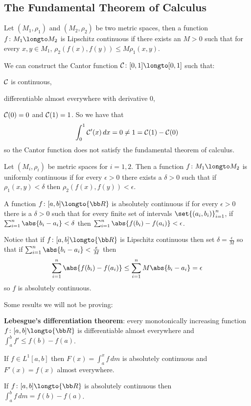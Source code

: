 \subsection{The Fundamental Theorem of Calculus}

\bdefn

    Let $(M_1,\rho_1)$ and $(M_2,\rho_2)$ be two metric spaces, then a function $f\colon M_1\longto M_2$ is {\emphcolor Lipschitz continuous} if there exists an $M>0$ such that for every $x,y\in M_1$,
    $\rho_2(f(x),f(y))\leq M\rho_1(x,y)$.

\edefn

\bnote

    We can construct the {\emphcolor Cantor function} ${\cal C}\colon[0,1]\longto[0,1]$ such that:
    \benum
        \item ${\cal C}$ is continuous,
        \item differentiable almost everywhere with derivative $0$,
        \item ${\cal C}(0)=0$ and ${\cal C}(1)=1$.
    \eenum
    So we have that
    $$ \int_0^1{\cal C}'(x)\,dx = 0 \neq 1 = {\cal C}(1) - {\cal C}(0) $$
    so the Cantor function does not satisfy the fundamental theorem of calculus.

\enote

\bdefn

    Let $(M_i,\rho_i)$ be metric spaces for $i=1,2$.
    Then a function $f\colon M_1\longto M_2$ is {\emphcolor uniformly continuous} if for every $\epsilon>0$ there exists a $\delta>0$ such that if $\rho_1(x,y)<\delta$ then $\rho_2(f(x),f(y))<\epsilon$.

\edefn

\bdefn

    A function $f\colon[a,b]\longto{\bb R}$ is {\emphcolor absolutely continuous} if for every $\epsilon>0$ there is a $\delta>0$ such that for every finite set of intervals $\set{(a_i,b_i)}_{i=1}^n$, if
    $\sum_{i=1}^n\abs{b_i-a_i}<\delta$ then $\sum_{i=1}^n\abs{f(b_i)-f(a_i)}<\epsilon$.

\edefn

Notice that if $f\colon[a,b]\longto{\bb R}$ is Lipschitz continuous then set $\delta=\frac\epsilon M$ so that if $\sum_{i=1}^n\abs{b_i-a_i}<\frac\epsilon M$ then
$$ \sum_{i=1}^n\abs{f(b_i)-f(a_i)} \leq \sum_{i=1}^n M\abs{b_i-a_i} = \epsilon $$
so $f$ is absolutely continuous.

Some results we will not be proving:
\benum
    \item {\bf Lebesgue's differentiation theorem}: every monotonically increasing function $f\colon[a,b]\longto{\bb R}$ is differentiable almost everywhere and $\int_a^b f'\leq f(b)-f(a)$.
    \item If $f\in L^1[a,b]$ then $F(x)=\int_a^xf\,dm$ is absolutely continuous and $F'(x)=f(x)$ almost everywhere.
    \item If $f\colon[a,b]\longto{\bb R}$ is absolutely continuous then $\int_a^bf\,dm=f(b)-f(a)$.
\eenum

